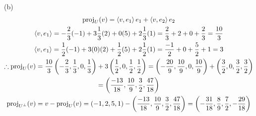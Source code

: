 \documentclass[a4paper,12pt]{report}
\begin{document}
\newpage
\sol (b)
\begin{gather*}  %
  \proj_{U}(v) = \brangle{v, e_1}e_1 + \brangle{v, e_2}e_2 \\
  \brangle{v, e_1} = -\frac{2}{3}(-1) + 3\frac{1}{3}(2) + 0(5) + 2\frac{1}{3}(1) = \frac{2}{3} + 2 + 0 + \frac{2}{3} = \frac{10}{3} \\
  \brangle{v, e_1} = \frac{1}{2}(-1) + 3(0)(2) + \frac{1}{2}(5) + 2\frac{1}{2}(1) = \frac{-1}{2} + 0 + \frac{5}{2} + 1 = 3 \\
  \tf\proj_{U}(v) = \frac{10}{3}\bracks{-\frac{2}{3}, \frac{1}{3}, 0, \frac{1}{3}} + 3\bracks{\frac{1}{2}, 0, \frac{1}{2}, \frac{1}{2}} = \bracks{-\frac{20}{9}, \frac{10}{9}, 0, \frac{10}{9}} + \bracks{\frac{3}{2}, 0, \frac{3}{2}, \frac{3}{2}} \\
    = \bracks{\frac{-13}{18}, \frac{10}{9}, \frac{3}{2}, \frac{47}{18}} \\
  \proj_{U^\perp}(v) = v - \proj_{U}(v) = (-1,2,5,1) - \bracks{\frac{-13}{18}, \frac{10}{9}, \frac{3}{2}, \frac{47}{18}} = \bracks{-\frac{31}{18}, \frac{8}{9}, \frac{7}{2}, -\frac{29}{18}}
\end{gather*}
\end{document}
